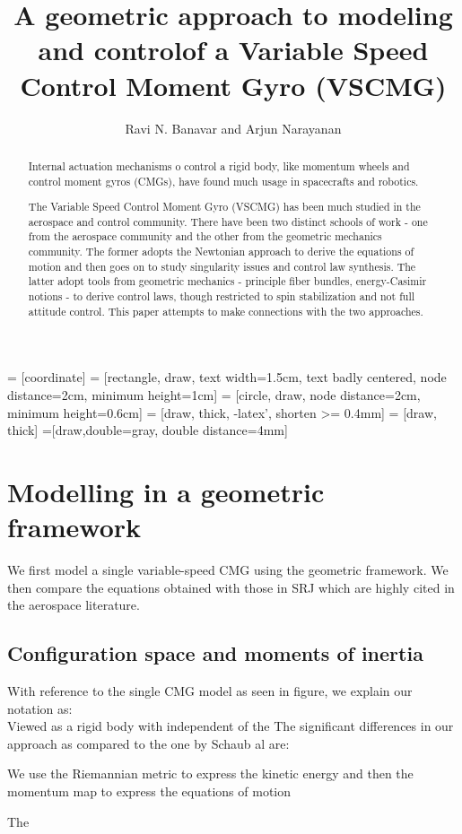 \documentclass[11pt]{article}                %
\title{A geometric approach to modeling and controlof a Variable Speed Control Moment Gyro (VSCMG)}
\author{Ravi N. Banavar and Arjun Narayanan \\
	\address{Systems and Control Engineering, \\
        Indian Institute of Technology Bombay, \\  Powai, Mumbai 400076, India. \\
        {\tt\small banavar@sc.iitb.ac.in}}}
\begin{document}
= [coordinate]
 = [rectangle, draw, text width=1.5cm, text badly centered, node distance=2cm, minimum
height=1cm]
 = [circle, draw, node distance=2cm, minimum height=0.6cm]
 = [draw, thick, -latex', shorten >= 0.4mm]
 = [draw, thick]
=[draw,double=gray, double distance=4mm]

\maketitle

\begin{abstract}
%
	Internal actuation mechanisms o control a rigid body, 
	like momentum wheels and control moment gyros (CMGs),
	have found much usage in spacecrafts and robotics.

	The Variable Speed Control Moment Gyro (VSCMG) has been much studied
	 in the aerospace and control community. There have been two distinct schools of work - 
	 one from the 
	aerospace community and the other from the geometric mechanics community.  The former
	adopts the Newtonian approach to derive the equations of motion and then goes on to study 
	singularity issues and control law synthesis. 
	The latter adopt tools from geometric mechanics - 
	principle fiber bundles, energy-Casimir notions - to derive control laws, though restricted to 
	spin stabilization and not full attitude control. This paper attempts to make connections 
	with the two approaches.

\end{abstract}
%
\section{Modelling in a geometric framework}
%
	We first model a single variable-speed CMG using the geometric framework. We then 
	compare the equations obtained with those in SRJ which are highly cited in the 
	aerospace literature.
	\subsection{ Configuration space and moments of inertia}
          With reference to the single CMG model as seen in figure, we explain our notation as:
          \\
          Viewed as a rigid body with independent of the 
           The significant differences in our approach as compared to the one by Schaub {\et al} are:
           \been
           \item We use the Riemannian metric to express the kinetic energy and then the momentum map to
                    express the equations of motion
           \item The 
           \een
\end{document}
